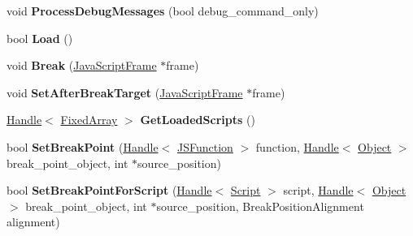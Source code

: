 \begin{DoxyCompactItemize}
\item 
void {\bfseries Process\+Debug\+Messages} (bool debug\+\_\+command\+\_\+only)\hypertarget{classv8_1_1internal_1_1_debug_aba6da5c23836a3d3dd2a5a02a57df0d3}{}\label{classv8_1_1internal_1_1_debug_aba6da5c23836a3d3dd2a5a02a57df0d3}

\item 
bool {\bfseries Load} ()\hypertarget{classv8_1_1internal_1_1_debug_a24f38cc4dba4a003dea1aad6a0031ec8}{}\label{classv8_1_1internal_1_1_debug_a24f38cc4dba4a003dea1aad6a0031ec8}

\item 
void {\bfseries Break} (\hyperlink{classv8_1_1internal_1_1_java_script_frame}{Java\+Script\+Frame} $\ast$frame)\hypertarget{classv8_1_1internal_1_1_debug_abeb7c406726e00d0087fa415f7a63936}{}\label{classv8_1_1internal_1_1_debug_abeb7c406726e00d0087fa415f7a63936}

\item 
void {\bfseries Set\+After\+Break\+Target} (\hyperlink{classv8_1_1internal_1_1_java_script_frame}{Java\+Script\+Frame} $\ast$frame)\hypertarget{classv8_1_1internal_1_1_debug_ac19235bcda6fb191a5e496de2213fc70}{}\label{classv8_1_1internal_1_1_debug_ac19235bcda6fb191a5e496de2213fc70}

\item 
\hyperlink{classv8_1_1internal_1_1_handle}{Handle}$<$ \hyperlink{classv8_1_1internal_1_1_fixed_array}{Fixed\+Array} $>$ {\bfseries Get\+Loaded\+Scripts} ()\hypertarget{classv8_1_1internal_1_1_debug_aede9b294a7515c5c79e3b3c53ac1706e}{}\label{classv8_1_1internal_1_1_debug_aede9b294a7515c5c79e3b3c53ac1706e}

\item 
bool {\bfseries Set\+Break\+Point} (\hyperlink{classv8_1_1internal_1_1_handle}{Handle}$<$ \hyperlink{classv8_1_1internal_1_1_j_s_function}{J\+S\+Function} $>$ function, \hyperlink{classv8_1_1internal_1_1_handle}{Handle}$<$ \hyperlink{classv8_1_1internal_1_1_object}{Object} $>$ break\+\_\+point\+\_\+object, int $\ast$source\+\_\+position)\hypertarget{classv8_1_1internal_1_1_debug_aa047b66d72a7082e5eee6e9d91ac9424}{}\label{classv8_1_1internal_1_1_debug_aa047b66d72a7082e5eee6e9d91ac9424}

\item 
bool {\bfseries Set\+Break\+Point\+For\+Script} (\hyperlink{classv8_1_1internal_1_1_handle}{Handle}$<$ \hyperlink{classv8_1_1internal_1_1_script}{Script} $>$ script, \hyperlink{classv8_1_1internal_1_1_handle}{Handle}$<$ \hyperlink{classv8_1_1internal_1_1_object}{Object} $>$ break\+\_\+point\+\_\+object, int $\ast$source\+\_\+position, Break\+Position\+Alignment alignment)\hypertarget{classv8_1_1internal_1_1_debug_aacfd725386e9637b2434202125c51db7}{}\label{classv8_1_1internal_1_1_debug_aacfd725386e9637b2434202125c51db7}


\end{DoxyCompactItemize}
